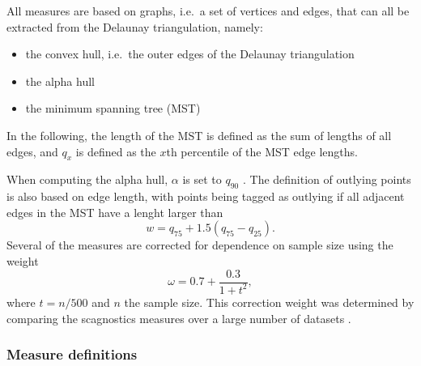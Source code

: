 All measures are based on graphs, i.e.~a set of vertices and edges, that
can all be extracted from the Delaunay triangulation, namely:

\begin{itemize}
\tightlist
\item
  the convex hull, i.e.~the outer edges of the Delaunay triangulation
\item
  the alpha hull \citep{1056714}
\item
  the minimum spanning tree (MST) \citep{kruskal1956}
\end{itemize}

In the following, the length of the MST is defined as the sum of lengths
of all edges, and \(q_x\) is defined as the \(x\)th percentile of the
MST edge lengths.

When computing the alpha hull, \(\alpha\) is set to \(q_{90}\)
\citep{scag}. The definition of outlying points is also based on edge
length, with points being tagged as outlying if all adjacent edges in
the MST have a lenght larger than \begin{equation}
w = q_{75} + 1.5 ( q_{75} - q_{25}).
\label{eq:w}
\end{equation} Several of the measures are corrected for dependence on
sample size using the weight \begin{equation}
\omega = 0.7 + \frac{0.3}{1+t^2},
\end{equation} where \(t = n / 500\) and \(n\) the sample size. This
correction weight was determined by comparing the scagnostics measures
over a large number of datasets \citep{scag}.

\hypertarget{measure-definitions}{%
\subsubsection{Measure definitions}\label{measure-definitions}}

